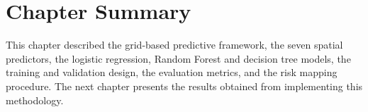 \section{Chapter Summary}

This chapter described the grid-based predictive framework, the seven spatial
predictors, the logistic regression, Random Forest and decision tree models,
the training and validation design, the evaluation metrics, and the risk
mapping procedure. The next chapter presents the results obtained from
implementing this methodology.
